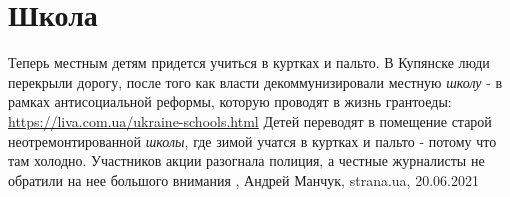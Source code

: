  
 
 
 
 
\chapter{Школа}

Теперь местным детям придется учиться в куртках и пальто. В Купянске люди
перекрыли дорогу, после того как власти декоммунизировали местную \emph{школу}
- в рамках антисоциальной реформы, которую проводят в жизнь грантоеды:
\url{https://liva.com.ua/ukraine-schools.html} Детей переводят в помещение
старой неотремонтированной \emph{школы}, где зимой учатся в куртках и пальто -
потому что там холодно. Участников акции разогнала полиция, а честные
журналисты не обратили на нее большого внимания
, 
Андрей Манчук, strana.ua, 20.06.2021

